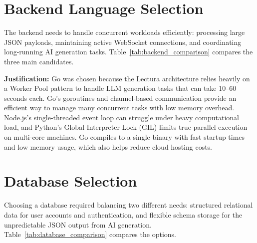 \section{Backend Language Selection}
The backend needs to handle concurrent workloads efficiently: processing large JSON payloads, maintaining active WebSocket connections, and coordinating long-running AI generation tasks. Table~\ref{tab:backend_comparison} compares the three main candidates.

\begin{table}[htbp]
\centering
{}
\vspace{6pt}
\caption{Backend language comparison for concurrent workload handling.}
\label{tab:backend_comparison}
\end{table}

\textbf{Justification:} Go was chosen because the Lectura architecture relies heavily on a Worker Pool pattern to handle LLM generation tasks that can take 10--60 seconds each. Go's goroutines and channel-based communication provide an efficient way to manage many concurrent tasks with low memory overhead. Node.js's single-threaded event loop can struggle under heavy computational load, and Python's Global Interpreter Lock (GIL) limits true parallel execution on multi-core machines. Go compiles to a single binary with fast startup times and low memory usage, which also helps reduce cloud hosting costs.

\section{Database Selection}
Choosing a database required balancing two different needs: structured relational data for user accounts and authentication, and flexible schema storage for the unpredictable JSON output from AI generation. Table~\ref{tab:database_comparison} compares the options.

